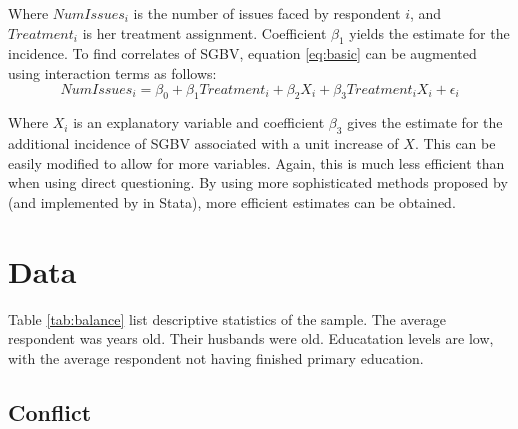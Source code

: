 \documentclass[10pt,a4paper,abstract=on]{scrartcl} %
\newcommand{\tableloc}{C:/Users/Koen/Dropbox/PhD/Papers/CongoGBV/Tables}
\begin{document}
Where \(NumIssues_i\) is the number of issues faced by respondent $i$, and \(Treatment_i\) is her treatment assignment. Coefficient \(\beta_1\) yields the estimate for the incidence. To find correlates of SGBV, equation \ref{eq:basic} can be augmented using interaction terms as follows: 
\begin{equation}
\label{eq:interaction}
NumIssues_i = \beta_0 + \beta_1 Treatment_i + \beta_2 X_i + \beta_3 Treatment_i X_i + \epsilon_i
\end{equation}

Where \(X_i\) is an explanatory variable and coefficient \(\beta_3\) gives the estimate for the additional incidence of SGBV associated with a unit increase of \(X\). This can be easily modified to allow for more variables. Again, this is much less efficient than when using direct questioning. By using more sophisticated methods proposed by \citet{Imai2011} (and implemented by \cite{Tsai2019} in Stata), more efficient estimates can be obtained. 





\section*{Data}
Table \ref{tab:balance} list descriptive statistics of the sample. The average respondent was  years old. Their husbands were  old. Educatation levels are low, with the average respondent not having finished primary education.


\subsection*{Conflict}
\end{document}
